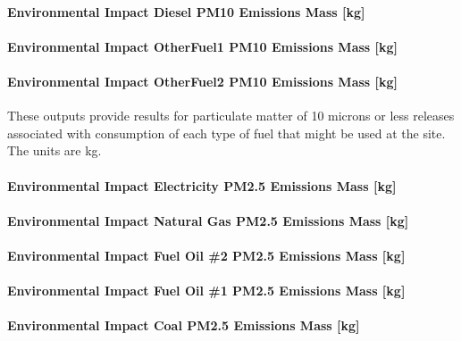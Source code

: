 \paragraph{Environmental Impact Diesel PM10 Emissions Mass {[}kg{]}}\label{environmental-impact-diesel-pm10-emissions-mass-kg}

\paragraph{Environmental Impact OtherFuel1 PM10 Emissions Mass {[}kg{]}}\label{environmental-impact-otherfuel1-pm10-emissions-mass-kg}

\paragraph{Environmental Impact OtherFuel2 PM10 Emissions Mass {[}kg{]}}\label{environmental-impact-otherfuel2-pm10-emissions-mass-kg}

These outputs provide results for particulate matter of 10 microns or less releases associated with consumption of each type of fuel that might be used at the site.~ The units are kg.

\paragraph{Environmental Impact Electricity PM2.5 Emissions Mass {[}kg{]}}\label{environmental-impact-electricity-pm2.5-emissions-mass-kg}

\paragraph{Environmental Impact Natural Gas PM2.5 Emissions Mass {[}kg{]}}\label{environmental-impact-natural-gas-pm2.5-emissions-mass-kg}

\paragraph{Environmental Impact Fuel Oil \#2 PM2.5 Emissions Mass {[}kg{]}}\label{environmental-impact-fuel-oil-2-pm2.5-emissions-mass-kg}

\paragraph{Environmental Impact Fuel Oil \#1 PM2.5 Emissions Mass {[}kg{]}}\label{environmental-impact-fuel-oil-1-pm2.5-emissions-mass-kg}

\paragraph{Environmental Impact Coal PM2.5 Emissions Mass {[}kg{]}}\label{environmental-impact-coal-pm2.5-emissions-mass-kg}

